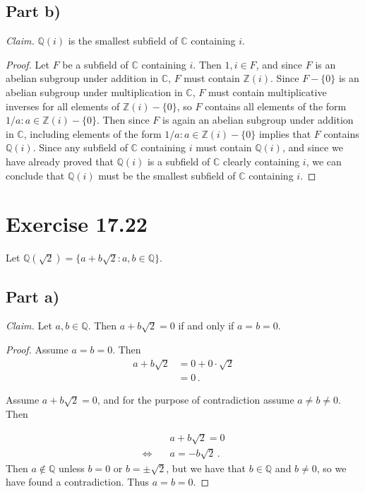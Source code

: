 \documentclass{abrice}
\newcommand{\Z}{\mathbb{Z}}
\newcommand{\Q}{\mathbb{Q}}
\renewcommand{\C}{\mathbb{C}}
\begin{document}
\subsection{Part b)}

\emph{Claim.} $\Q(i)$ is the smallest subfield of $\C$ containing $i$.

\begin{proof}
  Let $F$ be a subfield of $\C$ containing $i$. Then $1,i \in F$, and since $F$
  is an abelian subgroup under addition in $\C$, $F$ must contain $\Z(i)$. Since
  $F - \{0\}$ is an abelian subgroup under multiplication in $\C$, $F$ must
  contain multiplicative inverses for all elements of $\Z(i) - \{0\}$, so $F$
  contains all elements of the form $1/a : a \in \Z(i) - \{0\}$. Then since $F$
  is again an abelian subgroup under addition in $\C$, including elements of the
  form $1/a : a \in \Z(i) - \{0\}$ implies that $F$ contains $\Q(i)$. Since any
  subfield of $\C$ containing $i$ must contain $\Q(i)$, and since we have
  already proved that $\Q(i)$ is a subfield of $\C$ clearly containing $i$, we
  can conclude that $\Q(i)$ must be the smallest subfield of $\C$ containing
  $i$.
\end{proof}

\section{Exercise 17.22}

Let $\Q(\sqrt 2) = \{a + b\sqrt 2 : a,b \in \Q\}$.

\subsection{Part a)}

\emph{Claim.} Let $a,b \in \Q$. Then $a + b\sqrt 2 = 0$ if and only if $a = b =
0$.

\begin{proof}
  Assume $a = b =0$. Then
  \begin{align*}
    a + b \sqrt 2 &= 0 + 0 \cdot \sqrt 2 \\
                  &= 0\, .
  \end{align*}

  Assume $a + b \sqrt 2 = 0$, and for the purpose of contradiction assume $a
  \neq b \neq 0$. Then

  \begin{align*}
    &a + b\sqrt 2 = 0 \\ \Longleftrightarrow \quad
    &a = -b \sqrt{2}\, .
  \end{align*}
  Then $a \notin \Q$ unless $b = 0$ or $b = \pm \sqrt 2$, but we have that $b \in \Q$
  and $b \neq 0$, so we have found a contradiction. Thus $a = b = 0$.
\end{proof}
\end{document}
